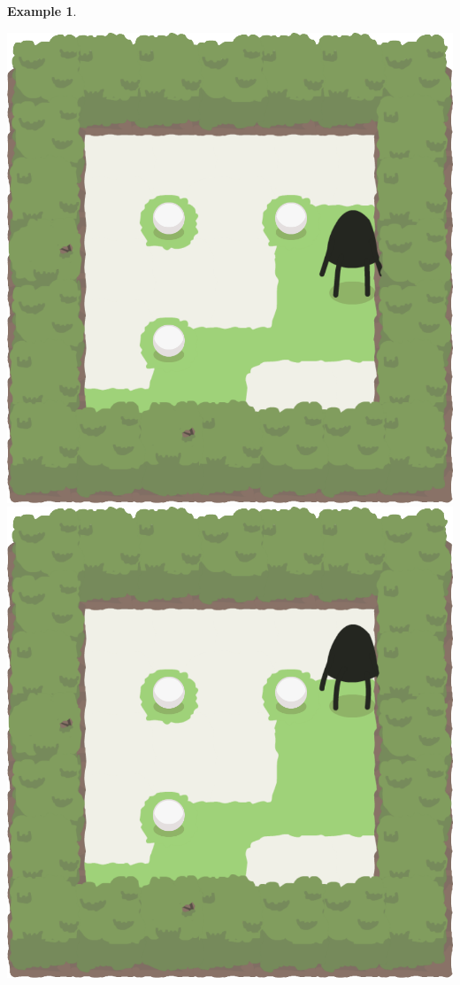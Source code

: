 \documentclass{report}
\theoremstyle{plain}
\newtheorem{example}{Example}[section]
\begin{document}
\begin{example}
\begin{center}
\includegraphics[width=\andyWidth\textwidth]{andy-basic-3.png} \quad
\includegraphics[width=\andyWidth\textwidth]{andy-basic-4.png}

\end{center}
\end{example}
\end{document}
